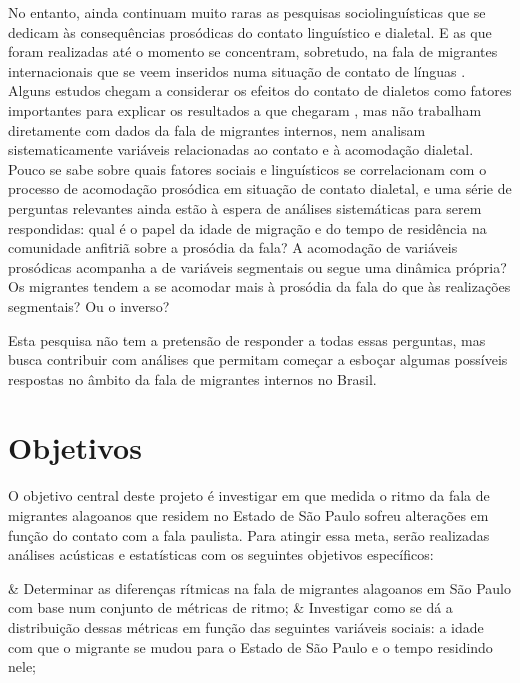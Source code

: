 \documentclass[
		a4paper,	%
		12pt,		%
		]{article}	%
\begin{document}
	No entanto, ainda continuam muito raras as pesquisas sociolinguísticas que
	se dedicam às consequências prosódicas do contato linguístico e dialetal. E
	as que foram realizadas até o momento se concentram, sobretudo, na fala de
	migrantes internacionais que se veem inseridos numa situação de contato de
	línguas \citep{Carter2005}. Alguns estudos chegam a considerar os efeitos do
	contato de dialetos como fatores importantes para explicar os resultados a que
	chegaram \citep{Torgersen.Szakay2012, Fagyal2010}, mas não trabalham
	diretamente com dados da fala de migrantes internos, nem analisam
	sistematicamente variáveis relacionadas ao contato e à acomodação dialetal.
	Pouco se sabe sobre quais fatores sociais e linguísticos se correlacionam
	com o processo de acomodação prosódica em situação de contato dialetal, e
	uma série de perguntas relevantes ainda estão à espera de análises
	sistemáticas para serem respondidas: qual é o papel da idade de migração e
	do tempo de residência na comunidade anfitriã sobre a prosódia da fala? A
	acomodação de variáveis prosódicas acompanha a de variáveis segmentais ou
	segue uma dinâmica própria? Os migrantes tendem a se acomodar mais à
	prosódia da fala do que às realizações segmentais? Ou o inverso? 
		
	Esta pesquisa não tem a pretensão de responder a todas essas perguntas, mas
	busca contribuir com análises que permitam começar a esboçar algumas
	possíveis respostas no âmbito da fala de migrantes internos no Brasil.

	\section{Objetivos} \label{objetivos}

	O objetivo central deste projeto é investigar em que medida o ritmo da fala
	de migrantes alagoanos que residem no Estado de São Paulo sofreu alterações
	em função do contato com a fala paulista. Para atingir essa meta, serão
	realizadas análises acústicas e estatísticas com os seguintes objetivos
	específicos:

	\begin{easylist}[enumerate]
		& Determinar as diferenças rítmicas na fala de migrantes alagoanos em
		São Paulo com base num conjunto de métricas de ritmo;
		& Investigar como se dá a distribuição dessas métricas em função das
		seguintes variáveis sociais: a idade com que o migrante se mudou para o
		Estado de São Paulo e o tempo residindo nele;
	\end{easylist}
\end{document}
